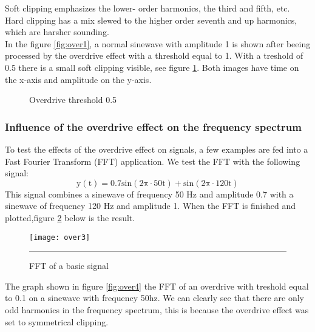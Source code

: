 Soft clipping emphasizes the lower- order harmonics, the third and fifth, etc. Hard clipping has a mix slewed to the higher order seventh and up harmonics, which are harsher sounding. \\
In the figure \ref{fig:over1}, a normal sinewave with amplitude 1 is shown after beeing processed by the overdrive effect with a threshold equal to 1. With a treshold of 0.5 there is a small soft clipping visible, see figure \ref{fig:over2}. Both images have time on the x-axis and amplitude on the y-axis.
\begin{figure}[ht]
  \hfill
  \begin{minipage}[t]{.45\textwidth}
    \begin{center}  
      \caption{Overdrive threshold 1}
      \label{fig:over1}
    \end{center}
  \end{minipage}
  \hfill
  \begin{minipage}[t]{.45\textwidth}
    \begin{center}  
      \caption{Overdrive threshold 0.5}
      \label{fig:over2}
    \end{center}
  \end{minipage}
  \hfill
\end{figure}
\subsubsection{Influence of the overdrive effect on the frequency spectrum}
To test the effects of the overdrive effect on signals, a few examples are fed into a Fast Fourier Transform (FFT) application. We test the FFT with the following signal: 
\begin{equation}
\mathrm{y(t) = 0.7 sin(2\pi \cdot 50t) + sin(2\pi \cdot 120t)}
\end{equation}
This signal combines a sinewave of frequency 50 Hz and amplitude 0.7 with a sinewave of frequency 120 Hz and amplitude 1. When the FFT is finished and plotted,figure \ref{fig:over3} below is the result.
\begin{figure}[htbp]
\centering
\texttt{[image: over3]}
\rule{30em}{0.5pt}
\caption{FFT of a basic signal}
\label{fig:over3}
\end{figure}
The graph shown in figure \ref{fig:over4} the FFT of an overdrive with treshold equal to 0.1 on a sinewave with frequency 50hz. We can clearly see that there are only odd harmonics in the frequency spectrum, this is because the overdrive effect was set to symmetrical clipping.

